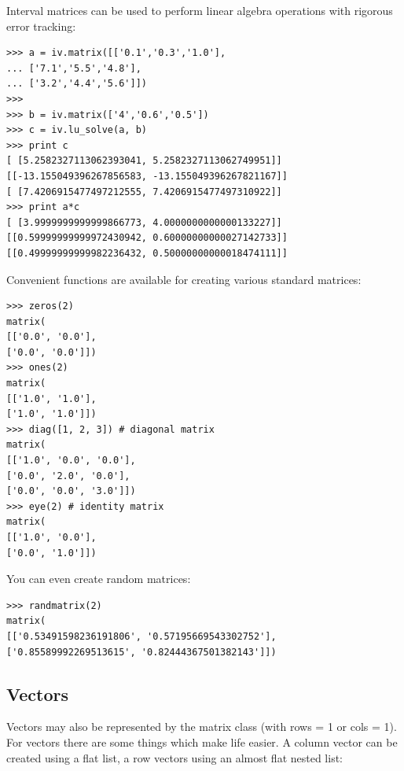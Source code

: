 Interval matrices can be used to perform linear algebra operations with rigorous error tracking:

\begin{lstlisting}
>>> a = iv.matrix([['0.1','0.3','1.0'],
... ['7.1','5.5','4.8'],
... ['3.2','4.4','5.6']])
>>>
>>> b = iv.matrix(['4','0.6','0.5'])
>>> c = iv.lu_solve(a, b)
>>> print c
[ [5.2582327113062393041, 5.2582327113062749951]]
[[-13.155049396267856583, -13.155049396267821167]]
[ [7.4206915477497212555, 7.4206915477497310922]]
>>> print a*c
[ [3.9999999999999866773, 4.0000000000000133227]]
[[0.59999999999972430942, 0.60000000000027142733]]
[[0.49999999999982236432, 0.50000000000018474111]]
\end{lstlisting}






Convenient functions are available for creating various standard matrices:

\begin{lstlisting}
>>> zeros(2)
matrix(
[['0.0', '0.0'],
['0.0', '0.0']])
>>> ones(2)
matrix(
[['1.0', '1.0'],
['1.0', '1.0']])
>>> diag([1, 2, 3]) # diagonal matrix
matrix(
[['1.0', '0.0', '0.0'],
['0.0', '2.0', '0.0'],
['0.0', '0.0', '3.0']])
>>> eye(2) # identity matrix
matrix(
[['1.0', '0.0'],
['0.0', '1.0']])
\end{lstlisting}

You can even create random matrices:

\begin{lstlisting}
>>> randmatrix(2)
matrix(
[['0.53491598236191806', '0.57195669543302752'],
['0.85589992269513615', '0.82444367501382143']])
\end{lstlisting}



\subsection{Vectors}

Vectors may also be represented by the matrix class (with rows = 1 or cols = 1). For vectors there are some things which make life easier. A column vector can be created using a flat list, a row vectors using an almost flat nested list:

